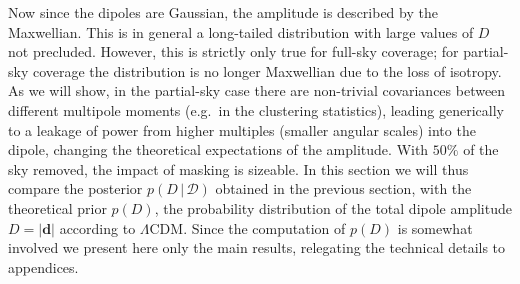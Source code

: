 \documentclass[fleqn,usenatbib]{mnras}
\def\mbf#1{\mathbf{#1}}
\def\mid{\,|\,}
\def\LCDM{$\Lambda$CDM}
\def\Dtot{D}
\begin{document}
Now since the dipoles are Gaussian, the amplitude is
described by the Maxwellian. This is in general a long-tailed distribution
with large values of $D$ not precluded. However, this is strictly only true
for full-sky coverage; for partial-sky coverage the distribution is no longer
Maxwellian due to the loss of isotropy. As we will show,
in the partial-sky case there are non-trivial covariances
between different multipole moments (e.g.~in the clustering
statistics), leading generically to a leakage of power from
higher multiples (smaller angular scales) into the dipole,
changing the theoretical expectations of the amplitude.
With $50\%$ of the sky removed, the impact of masking
is sizeable.
In this section we will thus compare the posterior $p(D\mid\mathscr{D})$
obtained in the previous section, with the theoretical prior $p(\Dtot)$,
the probability distribution of the total dipole amplitude
$\Dtot=|\mbf{d}|$ according to \LCDM. Since the computation of
$p(\Dtot)$ is somewhat involved we present here only the main results,
relegating the technical details to appendices.
\end{document}
